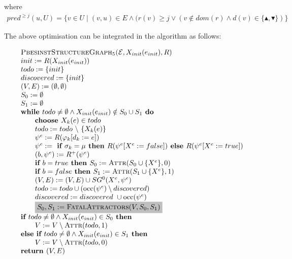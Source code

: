 \documentclass{article}
\begin{document}
where
\begin{eqnarray*}
pred^{\geq j}(u, U) = \{v \in U \mid (v,u) \in E \wedge (r(v) \ge j \vee (v \notin dom(r) \wedge d(v) \in \{\blacktriangle,\blacktriangledown\}) \}
\end{eqnarray*}%

The above optimisation can be integrated in the algorithm as follows:

\begin{equation*}
\begin{array}{l}
\textsc{PbesinstStructureGraph$_{5}$(}\mathcal{E}, X_{init}(e_{init}), R) \\ 
init:=R(X_{init}(e_{init})) \\
todo:=\{init\} \\
discovered:=\{init\} \\
(V,E) :=(\emptyset ,\emptyset ) \\ 
S_0:= \emptyset \\
S_1:= \emptyset \\
\textbf{while }todo \neq \emptyset \wedge X_{init}(e_{init}) \notin S_0 \cup S_1 \textbf{ do} \\ 
\qquad \text{\textbf{choose }}X_{k}(e)\in todo \\ 
\qquad todo:=todo\ \backslash \ \{X_{k}(e)\} \\ 
\qquad \psi ^{e}:=R(\varphi _{k}[d_{k}:=e]) \\ 
\qquad \psi^e := \textbf{ if } \sigma_k = \mu \textbf{ then } R(\psi^e[X^e := false])
\textbf{ else }  R(\psi^e[X^e := true]) \\
\qquad (b,\psi^e) := R^+(\psi^e) \\
\qquad \textbf{if $b = true$ then } S_0 := \textsc{Attr}(S_0 \cup \{ X^e \}, 0) \\
\qquad \textbf{if $b = false$ then } S_1 := \textsc{Attr}(S_1 \cup \{ X^e \}, 1) \\
\qquad (V,E) := (V,E) \cup SG^{0}(X^{e},\psi ^{e}) \\ 
\qquad todo:=todo\cup (\mathrm{occ}(\psi ^{e})\setminus discovered) \\
\qquad discovered:=discovered\ \cup \mathrm{occ}(\psi ^{e}) \\
\qquad \colorbox{lightgray}{$%
S_0, S_1 := \text{\textsc{FatalAttractors}}(V, S_0, S_1) $}\\  %
\textbf{if } todo \neq \emptyset \land X_{init}(e_{init}) \in S_0 \textbf{ then }\\
\qquad V := V \setminus \textsc{Attr}(todo, 1) \\
\textbf{else if } todo \neq \emptyset \land X_{init}(e_{init}) \in S_1 \textbf{ then }\\
\qquad V := V \setminus \textsc{Attr}(todo, 0) \\
\text{\textbf{return }}(V, E)
\end{array}%
\end{equation*}%
\end{document}
